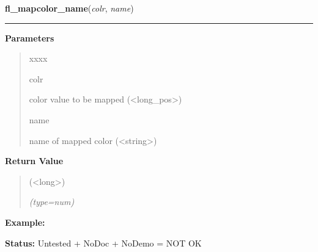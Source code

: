     \vspace{0.5ex}

\hspace{.8\funcindent}\begin{boxedminipage}{\funcwidth}

    \raggedright \textbf{fl\_mapcolor\_name}(\textit{colr}, \textit{name})

    \vspace{-1.5ex}

    \rule{\textwidth}{0.5\fboxrule}
\setlength{\parskip}{2ex}
\setlength{\parskip}{1ex}
      \textbf{Parameters}
      \vspace{-1ex}

      \begin{quote}
        \begin{Ventry}{xxxx}

          \item[colr]

          color value to be mapped ({\textless}long\_pos{\textgreater})

          \item[name]

          name of mapped color ({\textless}string{\textgreater})

        \end{Ventry}

      \end{quote}

      \textbf{Return Value}
    \vspace{-1ex}

      \begin{quote}
      ({\textless}long{\textgreater})

      {\it (type=num)}

      \end{quote}

\textbf{Example:} 

\textbf{Status:} Untested + NoDoc + NoDemo = NOT OK



    \end{boxedminipage}

    \label{xformslib:library:fl_free_colors}

    \vspace{0.5ex}

